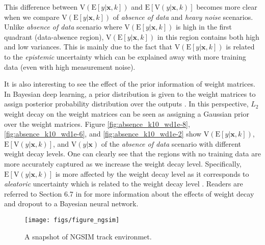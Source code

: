 \documentclass[letterpaper, 10 pt, conference]{ieeeconf}  %
\def\Bx{\mathbf{x}} \def\By{\mathbf{y}} \def\Bp{\mathbf{p}}
\begin{document}
This difference between $\mathrm{V}(\mathrm{E}[y|\Bx, k])$ 
and $\mathrm{E}[\mathrm{V}(y|\Bx, k)]$ becomes more clear when 
we compare
$\mathrm{V}(\mathrm{E}[y|\Bx, k])$ of \textit{absence of data}
and \textit{heavy noise} scenarios.
Unlike \textit{absence of data} scenario where 
$\mathrm{V}(\mathrm{E}[y|\Bx, k])$ is high in the first quadrant
(data-absence region), 
$\mathrm{V}(\mathrm{E}[y|\Bx, k])$ in this region
contains both high and low variances.
This is mainly due to the fact that $\mathrm{V}(\mathrm{E}[y|\Bx, k])$
is related to the \textit{epistemic} uncertainty which can be 
explained away with more training data
(even with high measurement noise). 


It is also interesting to see the effect of the prior information 
of weight matrices. 
In Bayesian deep learning, a prior distribution is given to the weight matrices
to assign posterior probability distribution over the outputs
\cite{Gal_16_thesis}.
In this perspective, $L_2$ weight decay 
on the weight matrices can be seen as assigning a Gaussian 
prior over the weight matrices. 
Figure \ref{fig:absence_k10_wd1e-8}, \ref{fig:absence_k10_wd1e-6},
and \ref{fig:absence_k10_wd1e-2} show
$\mathrm{V}(\mathrm{E}[y|\Bx, k])$, 
$\mathrm{E}[\mathrm{V}(y|\Bx, k)]$,
and
$\mathrm{V}(y|\Bx)$
of the 
\textit{absence of data} scenario
with different weight decay levels.
One can clearly see that the regions with no training data
are more accurately captured 
as we increase the weight decay level.
Specifically, $\mathrm{E}[\mathrm{V}(y|\Bx, k)]$
is more affected by the weight decay level
as it corresponds to \textit{aleatoric} uncertainty
which is related to the weight decay level \cite{Gal_16_thesis}.
Readers are referred to Section 6.7 in \cite{Gal_16_thesis}
for more information about the effects of weight decay and
dropout to a Bayesian neural network. 

\begin{figure*}[!t] \centering
	\texttt{[image: figs/figure\_ngsim]}
	\label{fig:trackres_a}
	\caption{
		A snapshot of NGSIM track environmet. 
		}
	\label{fig:ngsim}
\end{figure*}
\end{document}
